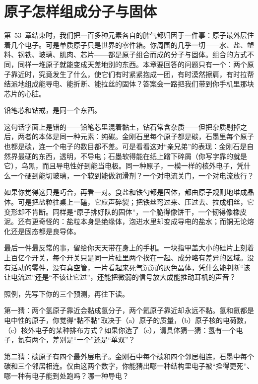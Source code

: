 \chapter{原子怎样组成分子与固体}

第~53~章结束时，我们把一百多种元素各自的脾气都归因于一件事：原子最外层住着几个电子。可是单质原子只是世界的零件箱。你周围的几乎一切——水、盐、塑料、钢铁、玻璃、肌肉、芯片——都是原子组合而成的分子与固体。组合的方式不同，同样一堆原子就能变成天差地别的东西。本章要回答的问题只有一个：两个原子靠近时，究竟发生了什么，使它们有时紧紧抱成一团，有时漠然擦肩，有时拉帮结派地组成能导电、能折断、能拉丝的固体？答案会一路把我们带到你手机里那块芯片的心脏。


铅笔芯和钻戒，是同一个东西。

这句话字面上是错的——铅笔芯里混着黏土，钻石常含杂质——但把杂质剔掉之后，两者的本体是同一种元素：纯碳。金刚石里每个原子都是碳，石墨里每个原子也都是碳，连一个电子的数目都不差。可是看看这对“亲兄弟”的表现：金刚石是自然界最硬的东西，透明，不导电；石墨软得能在纸上蹭下碎屑（你写字靠的就是它），乌黑，而且导电性好到能当电极。同一种原子，一模一样的核外电子，凭什么一个硬到能切玻璃，一个软到能做润滑剂？一个对电流关门，一个对电流放行？

如果你觉得这只是巧合，再看一对。食盐和铁勺都是固体，都由原子规则地堆成晶体。可是把盐粒往桌上一磕，它应声碎裂；把铁丝弯过来、压过去、拉成细丝，它变形却不肯断。同样是“原子排好队的固体”，一个脆得像饼干，一个韧得像橡皮泥。还有更奇怪的：盐粒本身是绝缘体，泡进水里却变成导电的盐水；而铜无论熔化还是固态都是良导体。

最后一件最反常的事，留给你天天带在身上的手机。一块指甲盖大小的硅片上刻着上百亿个开关，每个开关只是同一片硅里两个挨在一起、成分略有差异的区域。没有活动的零件，没有真空管，一片看起来死气沉沉的灰色晶体，凭什么能判断“该让电流过”还是“不该让它过”，还能把微弱的信号放大成能推动耳机的声音？


照例，先写下你的三个预测，再往下读。

第一猜：两个氢原子靠近会黏成氢分子，两个氦原子靠近却永远不黏。氢和氦都是电中性的原子，你觉得“黏不黏”取决于（a）原子的质量，（b）原子核的电荷数，（c）核外电子的某种排布方式？如果你选了（c），请具体猜一猜：氢有一个电子，氦有两个，差别是“一个”还是“单双”？

第二猜：碳原子有四个最外层电子。金刚石中每个碳和四个邻居相连，石墨中每个碳和三个邻居相连。仅由这两个数字，你能猜出哪一种结构里电子被“拴得更死”、哪一种有电子能到处跑吗？哪一种导电？

